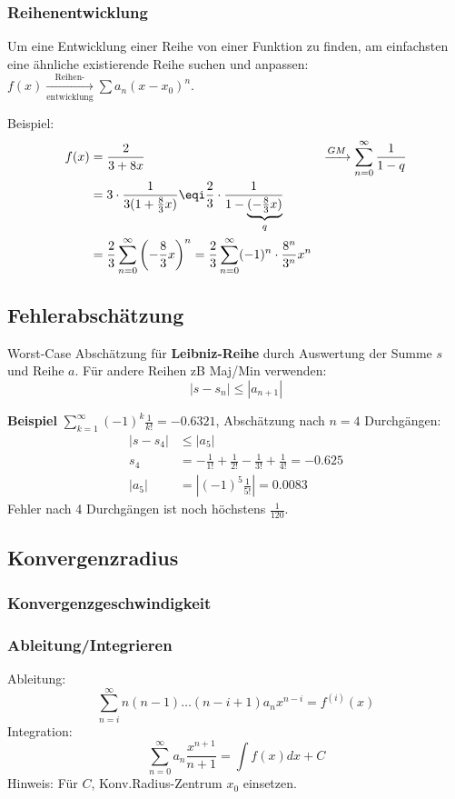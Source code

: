 \subsubsection{Reihenentwicklung}
Um eine Entwicklung einer Reihe von einer Funktion zu finden, am einfachsten eine ähnliche existierende Reihe suchen und anpassen: $f(x) \xrightarrow[\text{entwicklung}]{\text{Reihen-}} \sum a_n(x - x_0)^n$.

\noindent Beispiel:
\begin{align*}
	f(x) &= \frac{2}{3+8x} &\xrightarrow{GM} \sum_{n=0}^{\infty}\frac{1}{1-q} \\
	&= 3\cdot \frac{1}{3(1 + \tfrac{8}{3}x)} \eqi \frac{2}{3}\cdot \frac{1}{1 - \underbrace{(-\tfrac{8}{3}x)}_q} \\
	&= \frac{2}{3}\sum_{n=0}^{\infty}\left(-\frac{8}{3}x\right)^n = \frac{2}{3}\sum_{n=0}^{\infty}(-1)^n \cdot \frac{8^n}{3^n}x^n
\end{align*}

\subsection{Fehlerabschätzung}
Worst-Case Abschätzung für \textbf{Leibniz-Reihe} durch Auswertung der Summe $s$ und Reihe $a$. Für andere Reihen zB Maj/Min verwenden:
\[\left|s - s_n\right| \leq \left|a_{n+1}\right|\]

\noindent \textbf{Beispiel} $\sum_{k=1}^{\infty}(-1)^k\frac{1}{k!} = -0.6321$, Abschätzung nach $n=4$ Durchgängen:
\begin{align*}
	\left|s - s_4\right| &\leq \left|a_5\right| \\
	s_4 &= -\frac{1}{1!} + \frac{1}{2!} -\frac{1}{3!} + \frac{1}{4!} = -0.625 \\
	\left|a_5\right| &= \left|(-1)^5\frac{1}{5!}\right| = 0.0083	
\end{align*}
Fehler nach 4 Durchgängen ist noch höchstens $\tfrac{1}{120}$.

\subsection{Konvergenzradius}

\subsubsection{Konvergenzgeschwindigkeit}

\subsubsection{Ableitung/Integrieren}
Ableitung:\[\sum_{n=i}^{\infty}n(n-1)\dots(n-i+1)a_nx^{n-i}=f^{(i)}(x)\]
Integration: \[\sum_{n=0}^{\infty}a_n\frac{x^{n+1}}{n+1}=\int f(x)dx+C\]
Hinweis: Für $C$, Konv.Radius-Zentrum $x_0$ einsetzen.
